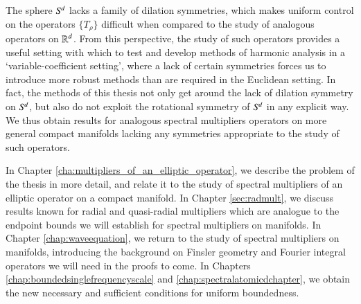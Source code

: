 The sphere ${S}^{\!{d}}$ lacks a family of dilation symmetries, which makes uniform control on the operators $\{ T_{\!\rho} \}$ difficult when compared to the study of analogous operators on $\operatorname{\mathbb{R}}^d$. From this perspective, the study of such operators provides a useful setting with which to test and develop methods of harmonic analysis in a `variable-coefficient setting', where a lack of certain symmetries forces us to introduce more robust methods than are required in the Euclidean setting.
%
%
%
In fact, the methods of this thesis not only get around the lack of dilation symmetry on ${S}^{\!{d}}$, but also do not exploit the rotational symmetry of ${S}^{\!{d}}$ in any explicit way. We thus obtain results for analogous spectral multipliers operators on more general compact manifolds lacking any symmetries appropriate to the study of such operators.
%

In Chapter \ref{cha:multipliers_of_an_elliptic_operator}, we describe the problem of the thesis in more detail, and relate it to the study of spectral multipliers of an elliptic operator on a compact manifold. In Chapter \ref{sec:radmult}, we discuss results known for radial and quasi-radial multipliers which are analogue to the endpoint bounds we will establish for spectral multipliers on manifolds. In Chapter \ref{chap:waveequation}, we return to the study of spectral multipliers on manifolds, introducing the background on Finsler geometry and Fourier integral operators we will need in the proofs to come. In Chapters \ref{chap:boundedsinglefrequencyscale} and \ref{chap:spectralatomicdchapter}, we obtain the new necessary and sufficient conditions for uniform boundedness.%

\pagebreak[3]